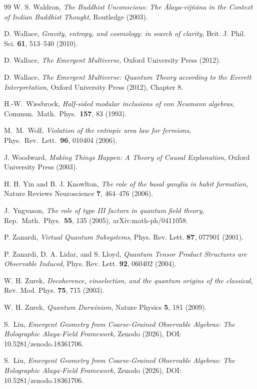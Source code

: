 \documentclass[12pt,a4paper,openany]{book}
\begin{document}
\begin{thebibliography}{99}
W. S. Waldron, \emph{The Buddhist Unconscious: The Ālaya-vijñāna in the Context of Indian Buddhist Thought}, Routledge (2003).

D. Wallace, \emph{Gravity, entropy, and cosmology: in search of clarity}, Brit. J. Phil. Sci. \textbf{61}, 513--540 (2010).

D. Wallace, \emph{The Emergent Multiverse}, Oxford University Press (2012).

D. Wallace, \emph{The Emergent Multiverse: Quantum Theory according to the Everett Interpretation}, Oxford University Press (2012), Chapter 8.

H.-W.~Wiesbrock,
\emph{Half-sided modular inclusions of von Neumann algebras},
Commun.\ Math.\ Phys.\ \textbf{157}, 83 (1993).

M.~M.~Wolf,
\emph{Violation of the entropic area law for fermions},
Phys.\ Rev.\ Lett.\ \textbf{96}, 010404 (2006).

J. Woodward, \emph{Making Things Happen: A Theory of Causal Explanation}, Oxford University Press (2003).

H. H. Yin and B. J. Knowlton, \emph{The role of the basal ganglia in habit formation}, Nature Reviews Neuroscience \textbf{7}, 464--476 (2006).

J.~Yngvason,
\emph{The role of type III factors in quantum field theory},
Rep.\ Math.\ Phys.\ \textbf{55}, 135 (2005),
arXiv:math-ph/0411058.

P. Zanardi, \emph{Virtual Quantum Subsystems}, Phys. Rev. Lett. \textbf{87}, 077901 (2001).

P. Zanardi, D. A. Lidar, and S. Lloyd, \emph{Quantum Tensor Product Structures are Observable Induced}, Phys. Rev. Lett. \textbf{92}, 060402 (2004).

W. H. Zurek, \emph{Decoherence, einselection, and the quantum origins of the classical}, Rev. Mod. Phys. \textbf{75}, 715 (2003).

W. H. Zurek, \emph{Quantum Darwinism}, Nature Physics \textbf{5}, 181 (2009).

S.~Liu, \emph{Emergent Geometry from Coarse-Grained Observable Algebras: The Holographic Alaya-Field Framework}, Zenodo (2026), DOI: 10.5281/zenodo.18361706.

S.~Liu, \emph{Emergent Geometry from Coarse-Grained Observable Algebras: The Holographic Alaya-Field Framework}, Zenodo (2026), DOI: 10.5281/zenodo.18361706.


\end{thebibliography}
\end{document}
